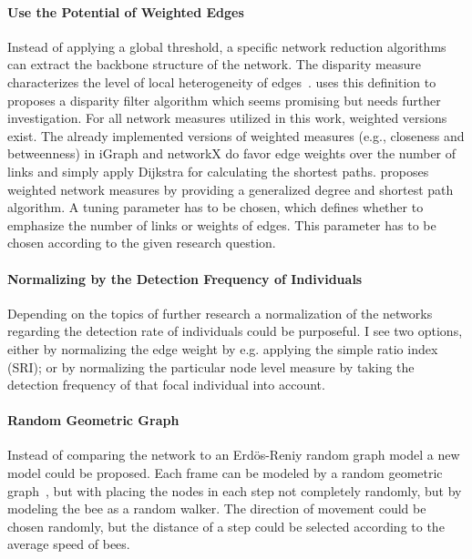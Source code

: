 \paragraph{Use the Potential of Weighted Edges}
Instead of applying a global threshold, a specific network reduction algorithms can extract the backbone structure of the network. The disparity measure characterizes the level of local heterogeneity of edges~\cite{barthelemy2003spatial}. \textcite{serrano2009extracting} uses this definition to proposes a disparity filter algorithm which seems promising but needs further investigation. 
For all network measures utilized in this work, weighted versions exist. The already implemented versions of weighted measures (e.g., closeness and betweenness) in iGraph and networkX do favor edge weights over the number of links and simply apply Dijkstra for calculating the shortest paths. \textcite{opsahl2010node} proposes weighted network measures by providing a generalized degree and shortest path algorithm. A tuning parameter has to be chosen, which defines whether to emphasize the number of links or weights of edges. This parameter has to be chosen according to the given research question.

\paragraph{Normalizing by the Detection Frequency of Individuals}
Depending on the topics of further research a normalization of the networks regarding the detection rate of individuals could be purposeful. 
I see two options, either by normalizing the edge weight by e.g. applying the simple ratio index (SRI); or by normalizing the particular node level measure by taking the detection frequency of that focal individual into account.

\paragraph{Random Geometric Graph}
Instead of comparing the network to an Erdös-Reniy random graph model a new model could be proposed.
Each frame can be modeled by a random geometric graph~\cite{rgg2002}, but with placing the nodes in each step not completely randomly, but by modeling the bee as a random walker. The direction of movement could be chosen randomly, but the distance of a step could be selected according to the average speed of bees. 


